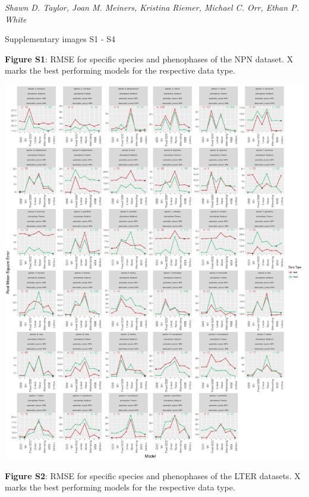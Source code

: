 \documentclass[a4paper,12pt]{article}
\begin{document}

\textit{Shawn D. Taylor, Joan M. Meiners, Kristina Riemer, Michael C. Orr, Ethan P. White}

\textbf{} \newline
Supplementary images S1 - S4

\textbf{Figure S1}: RMSE for specific species and phenophases of the NPN dataset. X marks the best performing models for the respective data type.

\newpage

\begin{center}
	\centering
		\includegraphics[width=1\textwidth]{supplement_best_npn_models.png}
\end{center}

\newpage
\textbf{Figure S2}: RMSE for specific species and phenophases of the LTER datasets. X marks the best performing models for the respective data type.
\end{document}
